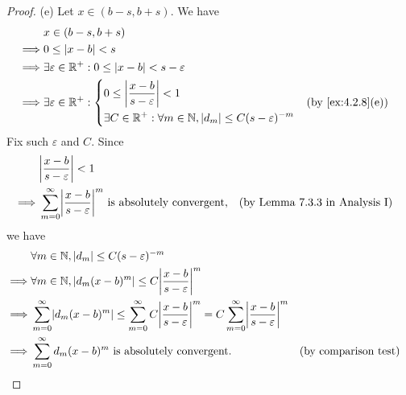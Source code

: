 \begin{proof}{(e)}
  Let \(x \in (b - s, b + s)\).
  We have
  \begin{align*}
             & x \in (b - s, b + s)                                                                                         \\
    \implies & 0 \leq \abs{x - b} < s                                                                                       \\
    \implies & \exists \varepsilon \in \R^+ : 0 \leq \abs{x - b} < s - \varepsilon                                          \\
    \implies & \exists \varepsilon \in \R^+ : \begin{dcases}
                                                0 \leq \abs{\dfrac{x - b}{s - \varepsilon}} < 1 \\
                                                \exists C \in \R^+ : \forall m \in \N, \abs{d_m} \leq C (s - \varepsilon)^{-m}
                                              \end{dcases} &  & \text{(by \cref{ex:4.2.8}(e))}
  \end{align*}
  Fix such \(\varepsilon\) and \(C\).
  Since
  \begin{align*}
             & \abs{\dfrac{x - b}{s - \varepsilon}} < 1                                                                                                \\
    \implies & \sum_{m = 0}^\infty \abs{\dfrac{x - b}{s - \varepsilon}}^m \text{ is absolutely convergent}, &  & \text{(by Lemma 7.3.3 in Analysis I)}
  \end{align*}
  we have
  \begin{align*}
             & \forall m \in \N, \abs{d_m} \leq C (s - \varepsilon)^{-m}                                                                                                                                                     \\
    \implies & \forall m \in \N, \abs{d_m (x - b)^m} \leq C \abs{\dfrac{x - b}{s - \varepsilon}}^{m}                                                                                                                         \\
    \implies & \sum_{m = 0}^\infty \abs{d_m (x - b)^m} \leq \sum_{m = 0}^\infty C \abs{\dfrac{x - b}{s - \varepsilon}}^{m} = C \sum_{m = 0}^\infty \abs{\dfrac{x - b}{s - \varepsilon}}^{m}                                  \\
    \implies & \sum_{m = 0}^\infty d_m (x - b)^m \text{ is absolutely convergent}.                                                                                                          &  & \text{(by comparison test)}

\end{align*}
\end{proof}
